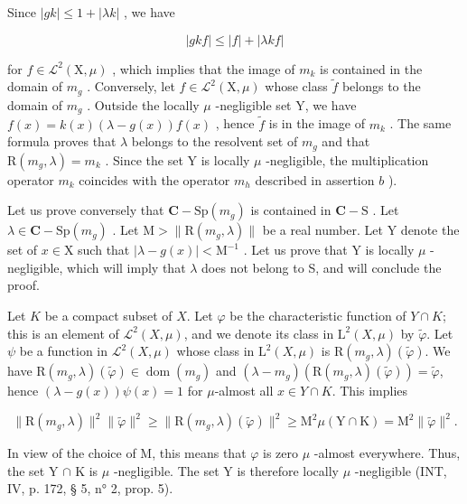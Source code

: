 Since \(|gk| \leqslant 1 + |\lambda k|\) , we have

\[
| g k f | \leqslant | f | + | \lambda k f |
\]

for \(f \in \mathcal{L}^2(\mathrm{X},\mu)\) , which implies that the image of \(m_k\) is contained in the domain of \(m_g\) . Conversely, let \(f \in \mathcal{L}^2(\mathrm{X},\mu)\) whose class \(\widetilde{f}\) belongs to the domain of \(m_g\) . Outside the locally \(\mu\) -negligible set Y, we have \(f(x) = k(x)(\lambda - g(x))f(x)\) , hence \(\widetilde{f}\) is in the image of \(m_k\) . The same formula proves that \(\lambda\) belongs to the resolvent set of \(m_g\) and that \(\mathrm{R}(m_g,\lambda) = m_k\) . Since the set Y is locally \(\mu\) -negligible, the multiplication operator \(m_k\) coincides with the operator \(m_h\) described in assertion \(b\) ).

Let us prove conversely that \(\mathbf{C} - \mathrm{Sp}(m_g)\) is contained in \(\mathbf{C} - \mathrm{S}\) . Let \(\lambda \in \mathbf{C} - \mathrm{Sp}(m_g)\) . Let \(\mathrm{M} > \| \mathrm{R}(m_g, \lambda) \|\) be a real number. Let Y denote the set of \(x \in \mathrm{X}\) such that \(|\lambda - g(x)| < \mathrm{M}^{-1}\) . Let us prove that Y is locally \(\mu\) -negligible, which will imply that \(\lambda\) does not belong to S, and will conclude the proof.

Let \(K\) be a compact subset of \(X\). Let \(\varphi\) be the characteristic function of \(Y \cap K\); this is an element of \(\mathcal{L}^{2}(X,\mu)\), and we denote its class in \(\mathrm{L}^{2}(X,\mu)\) by \(\widetilde{\varphi}\). Let \(\psi\) be a function in \(\mathcal{L}^{2}(X,\mu)\) whose class in \(\mathrm{L}^{2}(X,\mu)\) is \(\mathrm{R}(m_g,\lambda)(\widetilde{\varphi})\). We have \(\mathrm{R}(m_g,\lambda)(\widetilde{\varphi}) \in \operatorname{dom}(m_g)\) and \((\lambda - m_g)(\mathrm{R}(m_g,\lambda)(\widetilde{\varphi})) = \widetilde{\varphi}\), hence \((\lambda - g(x))\psi(x) = 1\) for \(\mu\)-almost all \(x \in Y \cap K\). This implies

\[
\| \mathrm{R} (m _ {g}, \lambda) \| ^ {2} \| \widetilde {\varphi} \| ^ {2} \geqslant \| \mathrm{R} (m _ {g}, \lambda) (\widetilde {\varphi}) \| ^ {2} \geqslant \mathrm{M} ^ {2} \mu (\mathrm{Y} \cap \mathrm{K}) = \mathrm{M} ^ {2} \| \widetilde {\varphi} \| ^ {2}.
\]

In view of the choice of M, this means that \(\varphi\) is zero \(\mu\) -almost everywhere. Thus, the set Y \(\cap\) K is \(\mu\) -negligible. The set Y is therefore locally \(\mu\) -negligible (INT, IV, p. 172, § 5, n° 2, prop. 5).

